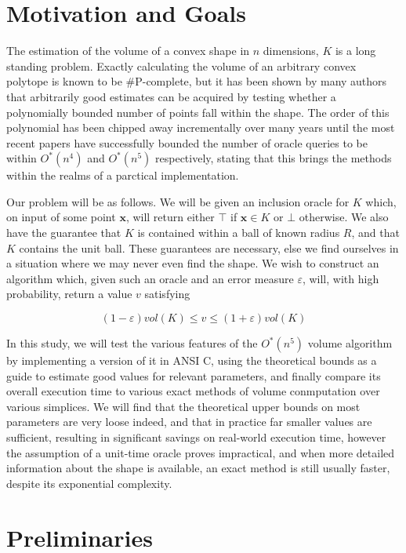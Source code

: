 \section{Motivation and Goals}

The estimation of the volume of a convex shape in $n$ dimensions, $K$ is a long standing problem. Exactly calculating the volume of an arbitrary convex polytope is known to be \#P-complete, %
 but it has been shown by many authors %
that arbitrarily good estimates can be acquired by testing whether a polynomially bounded number of points fall within the shape. The order of this polynomial has been chipped away incrementally over many years until the most recent papers %
have successfully bounded the number of oracle queries to be within $O^{*}(n^4)$ and $O^{*}(n^5)$ respectively, stating that this brings the methods within the realms of a parctical implementation.

Our problem will be as follows. We will be given an inclusion oracle for $K$ which, on input of some point $\bm{x}$, will return either $\top$ if $\bm{x} \in K$ or $\bot$ otherwise. We also have the guarantee that $K$ is contained within a ball of known radius $R$, and that $K$ contains the unit ball. These guarantees are necessary, else we find ourselves in a situation where we may never even find the shape. We wish to construct an algorithm which, given such an oracle and an error measure $\varepsilon$, will, with high probability, return a value $v$ satisfying

$$
(1-\varepsilon)vol(K) \leqslant v \leqslant (1+\varepsilon)vol(K)
$$

In this study, we will test the various features of the $O^{*}(n^5)$ volume algorithm by implementing a version of it in ANSI C, using the theoretical bounds as a guide to estimate good values for relevant parameters, and finally compare its overall execution time to various exact methods of volume conmputation over various simplices. We will find that the theoretical upper bounds on most parameters are very loose indeed, and that in practice far smaller values are sufficient, resulting in significant savings on real-world execution time, however the assumption of a unit-time oracle proves impractical, and when more detailed information about the shape is available, an exact method is still usually faster, despite its exponential complexity.

\section{Preliminaries}
